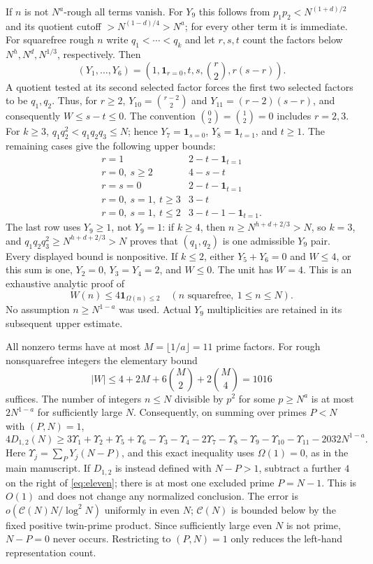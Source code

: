 \documentclass[11pt]{article}
\newcommand{\ind}{\mathbf1}
\newcommand{\CN}{\mathcal C(N)}
\begin{document}
If $n$ is not $N^a$-rough all terms vanish. For $Y_9$ this follows from
$p_1p_2<N^{(1+d)/2}$ and its quotient cutoff
$>N^{(1-d)/4}>N^a$; for every other term it is immediate.
For squarefree rough $n$ write $q_1<\cdots<q_k$ and let $r,s,t$ count
the factors below $N^h,N^d,N^{1/3}$, respectively. Then
\[
(Y_1,\ldots,Y_6)=(1,\ind_{r=0},t,s,{r\choose2},r(s-r)).
\]
A quotient tested at its second selected factor forces the first two
selected factors to be $q_1,q_2$. Thus, for $r\ge2$,
$Y_{10}={r-2\choose2}$ and $Y_{11}=(r-2)(s-r)$, and consequently
$W\le s-t\le0$. The convention ${0\choose2}={1\choose2}=0$ includes
$r=2,3$. For $k\ge3$, $q_1q_2^2<q_1q_2q_3\le N$; hence
$Y_7=\ind_{s=0}$, $Y_8=\ind_{t=1}$, and $t\ge1$.
The remaining cases give the following upper bounds:
\[
\begin{array}{c|c}
r=1&2-t-\ind_{t=1}\\
r=0,\ s\ge2&4-s-t\\
r=s=0&2-t-\ind_{t=1}\\
r=0,\ s=1,\ t\ge3&3-t\\
r=0,\ s=1,\ t\le2&3-t-1-\ind_{t=1}.
\end{array}
\]
The last row uses $Y_9\ge1$, not $Y_9=1$: if $k\ge4$, then
$n\ge N^{h+d+2/3}>N$, so $k=3$, and
$q_1q_2q_3^2\ge N^{h+d+2/3}>N$ proves that $(q_1,q_2)$ is one
admissible $Y_9$ pair. Every displayed bound is nonpositive.
If $k\le2$, either $Y_5+Y_6=0$ and $W\le4$, or this sum is one,
$Y_2=0$, $Y_3=Y_4=2$, and $W\le0$. The unit has $W=4$.
This is an exhaustive analytic proof of
\[
                  W(n)\le4\ind_{\Omega(n)\le2}
                  \quad(n\text{ squarefree},\ 1\le n\le N).
\]
No assumption $n\ge N^{1-a}$ was used. Actual $Y_9$ multiplicities
are retained in its subsequent upper estimate.

All nonzero terms have at most $M=\lfloor1/a\rfloor=11$ prime factors.
For rough nonsquarefree integers the elementary bound
\[
 |W|\le4+2M+6{M\choose2}+2{M\choose4}=1016
\]
suffices. The number of integers $n\le N$ divisible by $p^2$ for
some $p\ge N^a$ is at most $2N^{1-a}$ for sufficiently large $N$.
Consequently, on summing over primes $P<N$ with $(P,N)=1$,
\begin{equation}\label{eq:eleven}
4D_{1,2}(N)\ge3\Upsilon_1+\Upsilon_2+\Upsilon_5+\Upsilon_6
 -\Upsilon_3-\Upsilon_4-2\Upsilon_7-\Upsilon_8-\Upsilon_9
 -\Upsilon_{10}-\Upsilon_{11}-2032N^{1-a}.
\end{equation}
Here $\Upsilon_j=\sum_PY_j(N-P)$, and this exact inequality uses
$\Omega(1)=0$, as in the main manuscript. If $D_{1,2}$ is instead
defined with $N-P>1$, subtract a further $4$ on the right of
\eqref{eq:eleven}; there is at most one excluded prime $P=N-1$.
This is $O(1)$ and does not change any normalized conclusion.
The error is
$o(\CN N/\log^2N)$ uniformly in even $N$; $\CN$ is bounded below
by the fixed positive twin-prime product. Since sufficiently large even
$N$ is not prime, $N-P=0$ never occurs. Restricting to $(P,N)=1$
only reduces the left-hand representation count.
\end{document}
